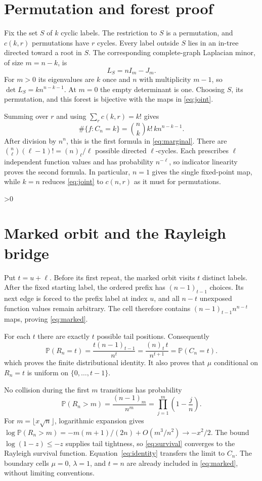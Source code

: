 \documentclass[10pt]{article}
\providecommand{\CRevisionRound}{2}
\newcommand{\Pp}{\mathbb P}
\newcommand{\fall}[2]{(#1)_{#2}}
\begin{document}
\section{Permutation and forest proof}
Fix the set $S$ of $k$ cyclic labels.  The restriction to $S$ is a
permutation, and $c(k,r)$ permutations have $r$ cycles.  Every label outside
$S$ lies in an in-tree directed toward a root in $S$.  The corresponding
complete-graph Laplacian minor, of size $m=n-k$, is
\[
 L_S=nI_m-J_m.
\]
For $m>0$ its eigenvalues are $k$ once and $n$ with multiplicity $m-1$, so
$\det L_S=k n^{n-k-1}$.  At $m=0$ the empty determinant is one.  Choosing
$S$, its permutation, and this forest is bijective with the maps in
\eqref{eq:joint}.

Summing over $r$ and using $\sum_r c(k,r)=k!$ gives
\[
 \#\{f:C_n=k\}=\binom nk k!\,k n^{n-k-1}.
\]
After division by $n^n$, this is the first formula in \eqref{eq:marginal}.
There are
$\binom n\ell(\ell-1)!=\fall n\ell/\ell$ possible directed
$\ell$-cycles.  Each prescribes $\ell$ independent function values and has
probability $n^{-\ell}$, so indicator linearity proves the second formula.
In particular, $n=1$ gives the single fixed-point map, while $k=n$ reduces
\eqref{eq:joint} to $c(n,r)$ as it must for permutations.

\ifnum\CRevisionRound>0
\section{Marked orbit and the Rayleigh bridge}
Put $t=u+\ell$.  Before its first repeat, the marked orbit visits $t$ distinct
labels.  After the fixed starting label, the ordered prefix has
$\fall{n-1}{t-1}$ choices.  Its next edge is forced to the prefix label at
index $u$, and all $n-t$ unexposed function values remain arbitrary.  The
cell therefore contains $\fall{n-1}{t-1}n^{n-t}$ maps, proving
\eqref{eq:marked}.

For each $t$ there are exactly $t$ possible tail positions.  Consequently
\begin{equation}
 \Pp(R_n=t)=\frac{t\fall{n-1}{t-1}}{n^t}
 =\frac{\fall nt\,t}{n^{t+1}}=\Pp(C_n=t).\label{eq:identity}
\end{equation}
which proves the finite distributional identity.  It also proves that
$\mu$ conditional on $R_n=t$ is uniform on $\{0,\ldots,t-1\}$.

No collision during the first $m$ transitions has probability
\begin{equation}
 \Pp(R_n>m)=\frac{\fall{n-1}m}{n^m}
 =\prod_{j=1}^m\left(1-\frac jn\right).\label{eq:survival}
\end{equation}
For $m=\lfloor x\sqrt n\rfloor$, logarithmic expansion gives
$\log\Pp(R_n>m)=-m(m+1)/(2n)+O(m^3/n^2)\to-x^2/2$.
The bound $\log(1-z)\le-z$ supplies tail tightness, so
\eqref{eq:survival} converges to the Rayleigh survival function.
Equation~\eqref{eq:identity} transfers the limit to $C_n$.
The boundary cells $\mu=0$, $\lambda=1$, and $t=n$ are already included in
\eqref{eq:marked}, without limiting conventions.
\fi
\end{document}
